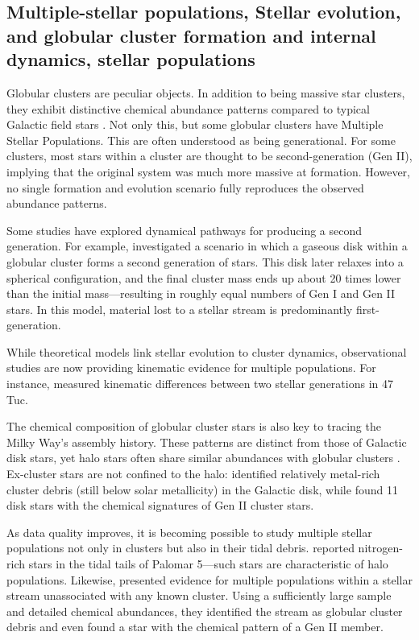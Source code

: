     \subsection{Multiple-stellar populations, Stellar evolution, and globular cluster formation and internal dynamics, stellar populations}
        Globular clusters are peculiar objects. In addition to being massive star clusters, they exhibit distinctive chemical abundance patterns compared to typical Galactic field stars \citep{2012A&ARv..20...50G,2018ARA&A..56...83B,2019A&ARv..27....8G}. Not only this, but some globular clusters have Multiple Stellar Populations. This are often understood as being generational. For some clusters, most stars within a cluster are thought to be second-generation (Gen II), implying that the original system was much more massive at formation. However, no single formation and evolution scenario fully reproduces the observed abundance patterns.
        
        Some studies have explored dynamical pathways for producing a second generation. For example, \citet{2024A&A...681A..45L} investigated a scenario in which a gaseous disk within a globular cluster forms a second generation of stars. This disk later relaxes into a spherical configuration, and the final cluster mass ends up about 20 times lower than the initial mass—resulting in roughly equal numbers of Gen I and Gen II stars. In this model, material lost to a stellar stream is predominantly first-generation.
        
        While theoretical models link stellar evolution to cluster dynamics, observational studies are now providing kinematic evidence for multiple populations. For instance, \citet{2025MNRAS.537.2342C} measured kinematic differences between two stellar generations in 47 Tuc.        
        
        The chemical composition of globular cluster stars is also key to tracing the Milky Way's assembly history. These patterns are distinct from those of Galactic disk stars, yet halo stars often share similar abundances with globular clusters \citep{2016ApJ...825..146M,2017MNRAS.465..501S}. Ex-cluster stars are not confined to the halo: \citet{2021ApJ...918L..37F} identified relatively metal-rich cluster debris (still below solar metallicity) in the Galactic disk, while \citet{2017ApJ...846L...2F} found 11 disk stars with the chemical signatures of Gen II cluster stars.

        As data quality improves, it is becoming possible to study multiple stellar populations not only in clusters but also in their tidal debris. \citet{2022MNRAS.510.3727P} reported nitrogen-rich stars in the tidal tails of Palomar 5—such stars are characteristic of halo populations. Likewise, \citet{2024MNRAS.529.2413U} presented evidence for multiple populations within a stellar stream unassociated with any known cluster. Using a sufficiently large sample and detailed chemical abundances, they identified the stream as globular cluster debris and even found a star with the chemical pattern of a Gen II member.
        
